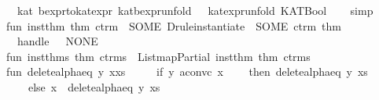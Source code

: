 \begin{isabellebody}
\endisatagproof
{\isafoldproof}%
%
\isadelimproof
\isanewline
%
\endisadelimproof
\isanewline
{}\isamarkupfalse%
\ {}\ kat{}\ bexpr{}to{}kat{}expr{}\ {}kat{}bexpr{}unfold\ {}\ {}\ kat{}expr{}unfold\ {}KATBool\ {}{}{}%
\isadelimproof
\ %
\endisadelimproof
%
\isatagproof
{}\isamarkupfalse%
\ simp%
\endisatagproof
{\isafoldproof}%
%
\isadelimproof
%
\endisadelimproof
\isanewline
%
\isadelimML
\isanewline
%
\endisadelimML
%
\isatagML
{}\isamarkupfalse%
\ {}\isanewline
\isanewline
fun\ inst{}thm\ thm\ ctrm\ {}\ SOME\ {}Drule{}instantiate{}\ {}{}\ {}SOME\ ctrm{}\ thm{}\isanewline
\ \ handle\ {}\ {}{}\ NONE\isanewline
\isanewline
fun\ inst{}thms\ thm\ ctrms\ {}\ List{}mapPartial\ {}inst{}thm\ thm{}\ ctrms\isanewline
\isanewline
fun\ delete{}alpha{}eq\ y\ {}x{}{}xs{}\ {}\isanewline
\ \ \ \ if\ y\ aconvc\ x\isanewline
\ \ \ \ then\ delete{}alpha{}eq\ y\ xs\isanewline
\ \ \ \ else\ x\ {}{}\ {}delete{}alpha{}eq\ y\ xs{}\isanewline

\end{isabellebody}
